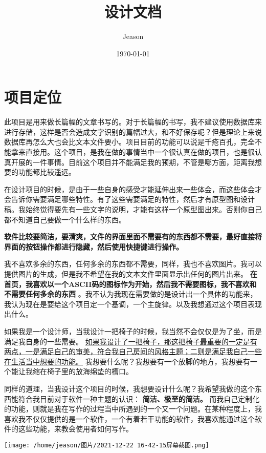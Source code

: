 \documentclass[11pt]{article}
\author{Jeason}
\date{\today}
\title{设计文档}
\begin{document}
\maketitle


\section*{项目定位}
\label{sec:orga726524}
此项目是用来做长篇幅的文章书写的。对于长篇幅的书写，我不建议使用数据库来进行存储，这样是否会造成文字识别的篇幅过大，和不好保存呢？但是理论上来说数据库再怎么大也会比文本文件要小。项目目前的功能可以说是千疮百孔，完全不能拿来直接用。这个项目，是我在做的事情当中一个很认真在做的项目，也是很认真开展的一件事情。目前这个项目并不能满足我的预期，不管是哪方面，距离我想要的功能都比较遥远。

在设计项目的时候，是由于一些自身的感受才能延伸出来一些体会，而这些体会才会告诉你需要满足哪些特性。有了这些需要满足的特性，然后才有原型图和设计稿。我始终觉得要先有一些文字的说明，才能有这样一个原型图出来。否则你自己都不知道自己要做一个什么样的东西。

\textbf{软件比较要简洁，要清爽，文件的界面里面不需要有的东西都不需要，最好直接将界面的按钮操作都进行隐藏，然后使用快捷键进行操作。}

我不喜欢多余的东西，任何多余的东西都不需要，同样，我也不喜欢图片。我可以提供图片的生成，但是我不希望在我的文本文件里面显示出任何的图片出来。 \textbf{在首页，我喜欢以一个ASCII码的图标作为开始，然后我不需要图标，我不喜欢和不需要任何多余的东西} 。我不认为我现在需要做的是设计出一个具体的功能来，我认为现在是要给这个项目定一个基调，一个主旋律。以及我想通过这个项目表现出什么。

如果我是一个设计师，当我设计一把椅子的时候，我当然不会仅仅是为了坐，而是满足我自身的一些需要。 \uline{如果我设计了一把椅子，那这把椅子最重要的一定是有两点，一是满足自己的审美，符合我自己房间的风格主题；二则是满足我自己一些在生活当中想要的功能。} 我想要什么呢？我想要有一个放脚的地方，我想要有一个能让我缩在椅子里的放海绵垫的槽口。

同样的道理，当我设计这个项目的时候，我想要设计什么呢？我希望我做的这个东西能符合我目前对于软件一种主题的认识： \textbf{简洁、极至的简洁。} 而我自己定制化的功能，则就是我在写作的过程当中所遇到的一个又一个问题。在某种程度上，我喜欢我不仅仅提供的是一个软件，一个有着若干功能的软件，我喜欢能通过这个软件的这些功能，来教会使用者如何写作。

\begin{center}
\texttt{[image: /home/jeason/图片/2021-12-22 16-42-15屏幕截图.png]}
\end{center}
\end{document}
